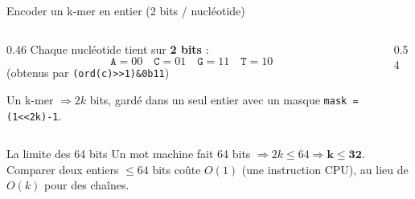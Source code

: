 \documentclass[aspectratio=169,11pt]{beamer}
\begin{document}
\begin{frame}{Encoder un k-mer en entier (2 bits / nucléotide)}
  \begin{columns}[T]
    \begin{column}{0.46\textwidth}
      \footnotesize
      Chaque nucléotide tient sur \textbf{2 bits} :
      \[ \texttt{A}{=}00\quad \texttt{C}{=}01\quad \texttt{G}{=}11\quad \texttt{T}{=}10 \]
      (obtenus par \texttt{(ord(c){>}{>}1)\&0b11})
      \medskip

      Un k-mer $\Rightarrow 2k$ bits, gardé dans un seul entier avec un masque
      \texttt{mask = (1{<}{<}2k)-1}.
    \end{column}
    \begin{column}{0.54\textwidth}
      \centering
    \end{column}
  \end{columns}
  \medskip
  \begin{alertblock}{La limite des 64 bits}
    \footnotesize
    Un mot machine fait 64 bits $\Rightarrow 2k\le 64 \Rightarrow \mathbf{k\le 32}$.
    Comparer deux entiers $\le 64$ bits coûte \textbf{$O(1)$} (une instruction CPU),
    au lieu de $O(k)$ pour des chaînes.
  \end{alertblock}
\end{frame}
\end{document}
